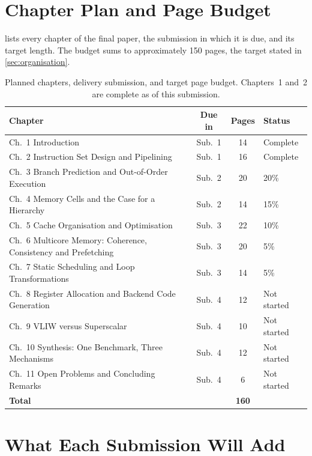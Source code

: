 \documentclass[11pt,a4paper]{report}
\begin{document}
\section{Chapter Plan and Page Budget}
\label{sec:plan-chapters}

 lists every chapter of the final paper, the
submission in which it is due, and its target length. The budget sums to
approximately 150 pages, the target stated in \cref{sec:organisation}.

\begin{table}[htbp]
\centering
\caption{Planned chapters, delivery submission, and target page budget.
Chapters~1 and~2 are complete as of this submission.}
\label{tab:page-budget}
\begin{tabular}{@{}L{0.42\textwidth}ccL{0.26\textwidth}@{}}
\toprule
\textbf{Chapter} & \textbf{Due in} & \textbf{Pages} & \textbf{Status} \\
\midrule
Ch.~1 Introduction & Sub.~1 & 14 & Complete \\
Ch.~2 Instruction Set Design and Pipelining & Sub.~1 & 16 & Complete \\
\midrule
Ch.~3 Branch Prediction and Out-of-Order Execution & Sub.~2 & 20 & 20\% \\
Ch.~4 Memory Cells and the Case for a Hierarchy & Sub.~2 & 14 & 15\% \\
Ch.~5 Cache Organisation and Optimisation & Sub.~3 & 22 & 10\% \\
Ch.~6 Multicore Memory: Coherence, Consistency and Prefetching & Sub.~3 & 20 & 5\% \\
\midrule
Ch.~7 Static Scheduling and Loop Transformations & Sub.~3 & 14 & 5\% \\
Ch.~8 Register Allocation and Backend Code Generation & Sub.~4 & 12 & Not started \\
Ch.~9 VLIW versus Superscalar & Sub.~4 & 10 & Not started \\
\midrule
Ch.~10 Synthesis: One Benchmark, Three Mechanisms & Sub.~4 & 12 & Not started \\
Ch.~11 Open Problems and Concluding Remarks & Sub.~4 & 6 & Not started \\
\midrule
\textbf{Total} & & \textbf{160} & \\
\bottomrule
\end{tabular}
\end{table}

\section{What Each Submission Will Add}
\label{sec:plan-submissions}
\end{document}
